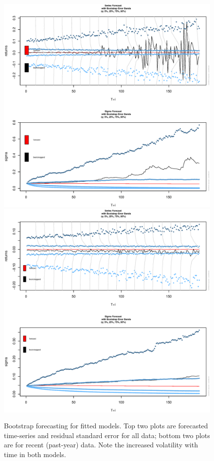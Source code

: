 \documentclass[12pt]{article}
\begin{document}
\begin{figure}[h]
\begin{center}
\centering
\includegraphics[width=.9\linewidth,height=.65\linewidth,trim={0 -50 0 125}]{boot_cast_all}\\
\includegraphics[width=.9\linewidth,height=.65\linewidth]{boot_cast_recent}\\
\caption{Bootstrap forecasting for fitted models. Top two plots are forecasted time-series and residual standard error for all data; bottom two plots are for recent (past-year) data. Note the increased volatility with time in both models.}
\label{fig:cast}
\end{center}
\end{figure}

\clearpage

\newpage



\vspace{5cm}
\end{document}
